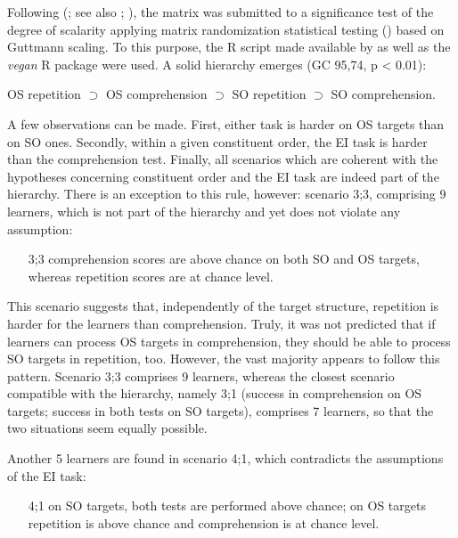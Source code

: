 Following \citeauthor{AldaiWichmann2018} (\citeyear{AldaiWichmann2018}; see also \citealt{Nyqvist2018, Wichmann2015, Wichmann2016}; \citealt[210-212]{HatchLazaraton1991}), the matrix was submitted to a significance test of the degree of scalarity applying matrix randomization statistical testing (\citealt{JanssenEtAl2006}) based on Guttmann scaling. To this purpose, the R script made available by \citet{AldaiWichmann2018} as well as the \textit{vegan} R package \citep{OksanenEtAl2019} were used. A solid hierarchy emerges (GC 95,74, p < 0.01): 

OS repetition ${\supset}$ OS comprehension ${\supset}$ SO repetition ${\supset}$ SO comprehension. 

A few observations can be made. First, either task is harder on OS targets than on SO ones. Secondly, within a given constituent order, the EI task is harder than the comprehension test. Finally, all scenarios which are coherent with the hypotheses concerning constituent order and the EI task are indeed part of the hierarchy. There is an exception to this rule, however: scenario 3;3, comprising 9 learners, which is not part of the hierarchy and yet does not violate any assumption:

\begin{itemize}
    \item[3;3]  comprehension scores are above chance on both SO and OS targets, whereas repetition scores are at chance level. 
\end{itemize}

This scenario suggests that, independently of the target structure, repetition is harder for the learners than comprehension. Truly, it was not predicted that if learners can process OS targets in comprehension, they should be able to process SO targets in repetition, too. However, the vast majority appears to follow this pattern. Scenario 3;3 comprises 9 learners, whereas the closest scenario compatible with the hierarchy, namely 3;1 (success in comprehension on OS targets; success in both tests on SO targets), comprises 7 learners, so that the two situations seem equally possible. 

Another 5 learners are found in scenario 4;1, which contradicts the assumptions of the EI task: 

\begin{itemize}
    \item[4;1]  on SO targets, both tests are performed above chance; on OS targets repetition is above chance and comprehension is at chance level. 
\end{itemize}

